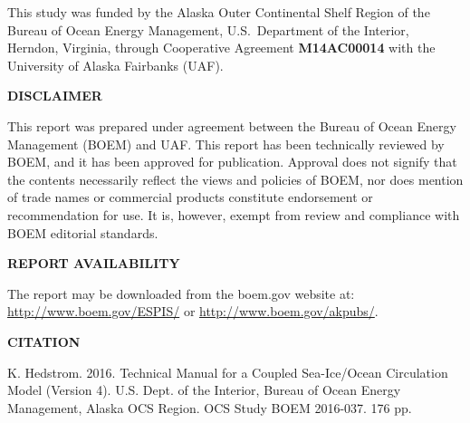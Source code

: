 This study was funded by the Alaska Outer Continental Shelf Region
of the Bureau of Ocean Energy Management, U.S.\ Department of the
Interior, Herndon, Virginia, through Cooperative Agreement
{\bf M14AC00014} with the University of Alaska Fairbanks (UAF).


\newpage
\vfil
\centerline{\bf DISCLAIMER}

\vfil
\noindent
This report was prepared under agreement between the Bureau of Ocean
Energy Management (BOEM) and UAF. This report has
been technically reviewed by BOEM, and it has been approved for
publication. Approval does not signify that the contents necessarily
reflect the views and policies of BOEM, nor does mention of trade
names or commercial products constitute endorsement or
recommendation for use. It is, however, exempt from review and
compliance with BOEM editorial standards.

\vfil
\centerline{\bf REPORT AVAILABILITY}
\vfil

\noindent
The report may be downloaded
from the boem.gov website at:
\href{http://www.boem.gov/ESPIS/}{http://www.boem.gov/ESPIS/} or
\href{http://www.boem.gov/akpubs/}{http://www.boem.gov/akpubs/}.

\vfil

\centerline{\bf CITATION}
\vfil

\noindent K. Hedstrom. 2016. Technical Manual for a Coupled Sea-Ice/Ocean
Circulation Model (Version 4).
U.S. Dept. of the Interior, Bureau of Ocean Energy Management,
Alaska OCS Region. OCS Study BOEM 2016-037. 176 pp.


\pagestyle{fancyplain}
\renewcommand{\headrulewidth}{0pt}
\setcounter{page}{1}
\tableofcontents
\newpage
\listoffigures
\listoftables
%





%

%


%
%
\appendix






%



%

\newpage
\pagestyle{empty}

